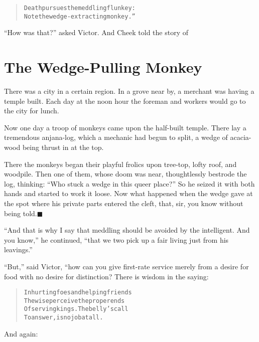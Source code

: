 \documentclass[article, twoside, 14pt]{memoir}
\newcommand{\qed}{\hfill \ensuremath{\blacksquare}}
\renewenvironment{verbatim}{%
\begin{quote}%
\vskip -10pt%
\begin{alltt}\normalfont\large}{\end{alltt}%
\end{quote}%
\vskip -10pt
} %
\begin{document}
\begin{verbatim}
Death pursues the meddling flunkey:
Note the wedge-extracting monkey.”
\end{verbatim}
``How was that?'' asked Victor. And Cheek told the story of

\chapter{The Wedge-Pulling Monkey}

\label{s2}

There was a city in a certain region. In a grove near by, a
merchant was having a temple built. Each day at the noon hour the
foreman and workers would go to the city for lunch.

Now one day a troop of monkeys came upon the half-built temple.
There lay a tremendous anjana-log, which a mechanic had begun to
split, a wedge of acacia-wood being thrust in at the top.

There the monkeys began their playful frolics upon tree-top, lofty
roof, and woodpile. Then one of them, whose doom was near,
thoughtlessly bestrode the log, thinking:
``Who stuck a wedge in this queer place?'' So he seized it with
both hands and started to work it loose. Now what happened when the
wedge gave at the spot where his private parts entered the cleft,
that, sir, you know without being told.\hyperref[s2]{\qed}

``And that is why I say that meddling should be avoided by the intelligent. And you know,''
he continued,
``that we two pick up a fair living just from his leavings.''

``But,'' said Victor, “how can you give first-rate service merely
from a desire for food with no desire for distinction? There is
wisdom in the saying:

\begin{verbatim}
In hurting foes and helping friends
The wise perceive the proper ends
Of serving kings. The belly's call
To answer, is no job at all.
\end{verbatim}
And again:
\end{document}
